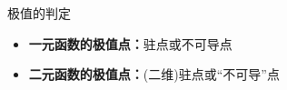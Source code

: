 \begin{frame}{极值的判定}
	\linespread{1.2}
	\begin{itemize}
	  \item {\bf 一元函数的极值点：}\pause \alert{驻点}或\alert{不可导点}\pause 
	  \item {\bf 二元函数的极值点：}\pause \alert{(二维)驻点}或\alert{“不可导”点}\pause 
	\end{itemize}
	\begin{columns}
			\begin{center}
				\pause 
			\end{center}
			\begin{center}

\end{center}
\end{columns}
\end{frame}
